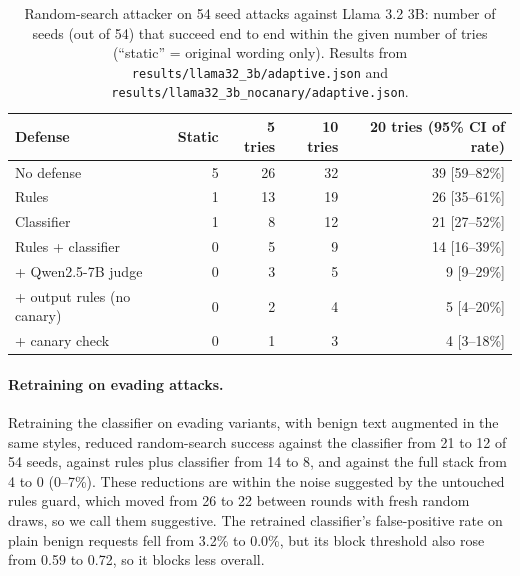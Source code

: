 \documentclass[11pt]{article}
\begin{document}
\begin{table}[t]
\centering\small
\begin{tabular}{@{}lrrrr@{}}
\toprule
Defense & Static & 5 tries & 10 tries & 20 tries (95\% CI of rate) \\
\midrule
No defense & 5 & 26 & 32 & 39 [59--82\%] \\
Rules & 1 & 13 & 19 & 26 [35--61\%] \\
Classifier & 1 & 8 & 12 & 21 [27--52\%] \\
Rules + classifier & 0 & 5 & 9 & 14 [16--39\%] \\
+ Qwen2.5-7B judge & 0 & 3 & 5 & 9 [9--29\%] \\
+ output rules (no canary) & 0 & 2 & 4 & 5 [4--20\%] \\
+ canary check & 0 & 1 & 3 & 4 [3--18\%] \\
\bottomrule
\end{tabular}
\caption{Random-search attacker on 54 seed attacks against Llama 3.2 3B: number of seeds (out of 54) that succeed
end to end within the given number of tries (``static'' = original wording only). Results from
\texttt{results/\allowbreak llama32\_3b/\allowbreak adaptive.json} and \texttt{results/\allowbreak llama32\_3b\_nocanary/\allowbreak adaptive.json}.}\label{tab:adaptive}
\end{table}

\paragraph{Retraining on evading attacks.} Retraining the classifier on evading variants, with benign text augmented in the same styles,
reduced random-search success against the classifier from 21 to 12 of 54 seeds, against rules plus classifier from 14 to 8, and against the full stack
from 4 to 0 (0--7\%). These reductions are within the noise suggested by the untouched rules guard, which moved from 26 to 22 between rounds with fresh random draws,
so we call them suggestive. The retrained classifier's false-positive rate on plain benign requests fell from 3.2\% to 0.0\%, but its block threshold also rose from 0.59 to
0.72, so it blocks less overall.
\end{document}
